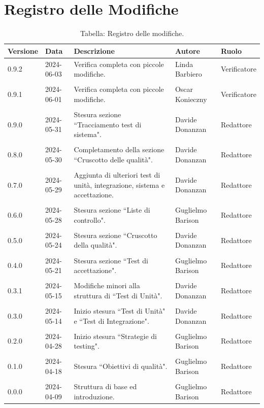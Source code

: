\documentclass[8pt]{article}
\begin{document}
\section*{Registro delle Modifiche}
\begin{table}[ht!]	
	\centering
	\begin{tabular}{p{1.2cm} p{2cm} p{6cm} p{3cm} p{2cm}}
		\toprule
		\textbf{Versione}& \textbf{Data} & \textbf{Descrizione} & \textbf{Autore} & \textbf{Ruolo} \\
		\midrule
        0.9.2 & 2024-06-03 & Verifica completa con piccole modifiche. & Linda Barbiero & Verificatore \\\\
        0.9.1 & 2024-06-01 & Verifica completa con piccole modifiche. & Oscar Konieczny & Verificatore \\\\
        0.9.0 & 2024-05-31 & Stesura sezione ``Tracciamento test di sistema". & Davide Donanzan & Redattore \\\\
        0.8.0 & 2024-05-30 & Completamento della sezione ``Cruscotto delle qualità". & Davide Donanzan & Redattore \\\\
        0.7.0 & 2024-05-29 & Aggiunta di ulteriori test di unità, integrazione, sistema e accettazione. & Davide Donanzan & Redattore \\\\
        0.6.0 & 2024-05-28 & Stesura sezione ``Liste di controllo". & Guglielmo Barison & Redattore \\\\
        0.5.0 & 2024-05-24 & Stesura sezione ``Cruscotto della qualità". & Davide Donanzan & Redattore \\\\
        0.4.0 & 2024-05-21 & Stesura sezione ``Test di accettazione". & Guglielmo Barison & Redattore \\\\
        0.3.1 & 2024-05-15 & Modifiche minori alla struttura di ``Test di Unità". & Davide Donanzan & Redattore \\\\
		0.3.0 & 2024-05-14 & Inizio stesura ``Test di Unità" e ``Test di Integrazione". & Davide Donanzan & Redattore \\\\
		0.2.0 & 2024-04-28 & Inizio stesura ``Strategie di testing". & Guglielmo Barison & Redattore \\\\
		0.1.0 & 2024-04-18 & Stesura ``Obiettivi di qualità". & Guglielmo Barison & Redattore \\\\
		0.0.0 & 2024-04-09 & Struttura di base ed introduzione.  & Guglielmo Barison & Redattore \\
		\bottomrule
	\end{tabular}
	\caption*{Tabella: Registro delle modifiche.}
	\label{table:Registro delle modifiche}
\end{table}
\newpage
\tableofcontents
\newpage
\listoffigures
\newpage
\listoftables
\newpage
\justifying
\end{document}
